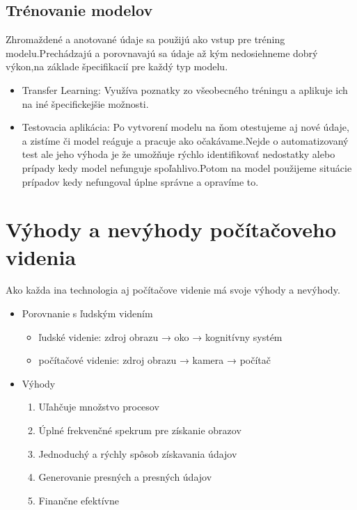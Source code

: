 \documentclass[10pt,twoside,slovak,a4paper]{coursepaper}
\begin{document}
\subsection{Trénovanie modelov} \label{ina:nejako}
Zhromaždené a anotované údaje sa použijú ako vstup pre tréning modelu.Prechádzajú a porovnavajú sa údaje až kým nedosiehneme dobrý výkon,na základe špecifikacií pre každý typ modelu.

\begin{itemize}
\item Transfer Learning: Využíva poznatky zo všeobecného tréningu a aplikuje ich na iné špecifickejšie možnosti.
\item Testovacia aplikácia: Po vytvorení modelu na ňom otestujeme aj nové údaje, a zistíme či model reáguje a pracuje ako očakávame.Nejde o automatizovaný test ale jeho výhoda je že umožňuje rýchlo identifikovať nedostatky alebo prípady kedy model nefunguje spoľahlivo.Potom na model použijeme situácie prípadov kedy nefungoval úplne správne a opravíme to.
\end{itemize} 


\centering




\section{Výhody a nevýhody počítačoveho videnia} \label{ina}
Ako každa ina technologia aj počítačove videnie má svoje výhody a nevýhody.
\begin{itemize}
\item Porovnanie s ľudským videním
	\begin{itemize}
	\item ľudské videnie: zdroj obrazu → oko → kognitívny systém
	\item počítačové videnie: zdroj obrazu → kamera → počítač
	\end{itemize}
\end{itemize}

\begin{itemize}
\item Výhody
	\begin{enumerate}
	\item Uľahčuje množstvo procesov
	\item Úplné frekvenčné spekrum pre získanie obrazov
	\item Jednoduchý a rýchly spôsob získavania údajov
	\item Generovanie presných a presných údajov
	\item Finančne efektívne
	\end{enumerate}
\end{itemize}
\end{document}

